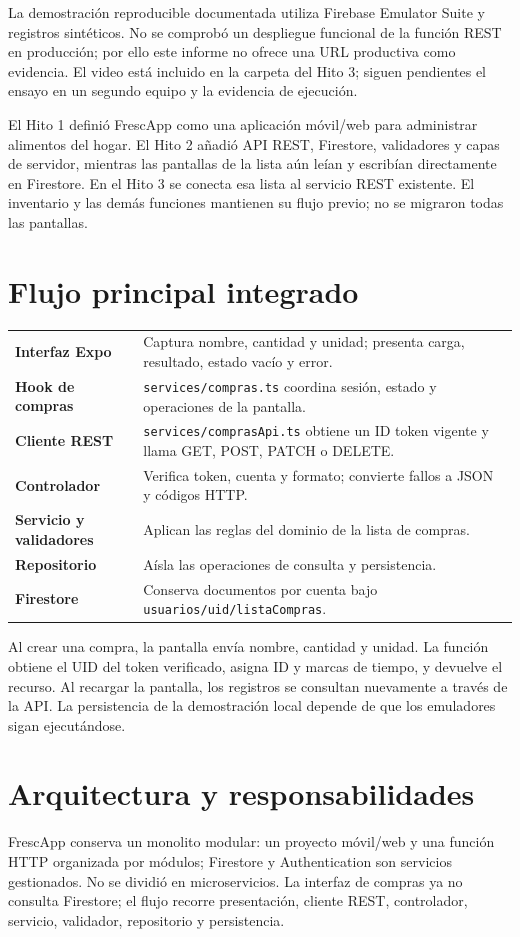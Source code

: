 \documentclass[11pt,a4paper]{article}
\newcommand{\pathcode}[1]{\texttt{\small #1}}
\begin{document}
La demostración reproducible documentada utiliza Firebase Emulator Suite y registros sintéticos. No se comprobó un despliegue funcional de la función REST en producción; por ello este informe no ofrece una URL productiva como evidencia. El video está incluido en la carpeta del Hito 3; siguen pendientes el ensayo en un segundo equipo y la evidencia de ejecución.

El Hito 1 definió FrescApp como una aplicación móvil/web para administrar alimentos del hogar. El Hito 2 añadió API REST, Firestore, validadores y capas de servidor, mientras las pantallas de la lista aún leían y escribían directamente en Firestore. En el Hito 3 se conecta esa lista al servicio REST existente. El inventario y las demás funciones mantienen su flujo previo; no se migraron todas las pantallas.

\section{Flujo principal integrado}
\begin{tabularx}{\textwidth}{>{\bfseries}p{3.6cm}Y}
Interfaz Expo & Captura nombre, cantidad y unidad; presenta carga, resultado, estado vacío y error.\\
Hook de compras & \pathcode{services/compras.ts} coordina sesión, estado y operaciones de la pantalla.\\
Cliente REST & \pathcode{services/comprasApi.ts} obtiene un ID token vigente y llama GET, POST, PATCH o DELETE.\\
Controlador & Verifica token, cuenta y formato; convierte fallos a JSON y códigos HTTP.\\
Servicio y validadores & Aplican las reglas del dominio de la lista de compras.\\
Repositorio & Aísla las operaciones de consulta y persistencia.\\
Firestore & Conserva documentos por cuenta bajo \pathcode{usuarios/{uid}/listaCompras}.\\
\end{tabularx}

Al crear una compra, la pantalla envía nombre, cantidad y unidad. La función obtiene el UID del token verificado, asigna ID y marcas de tiempo, y devuelve el recurso. Al recargar la pantalla, los registros se consultan nuevamente a través de la API. La persistencia de la demostración local depende de que los emuladores sigan ejecutándose.

\section{Arquitectura y responsabilidades}
FrescApp conserva un monolito modular: un proyecto móvil/web y una función HTTP organizada por módulos; Firestore y Authentication son servicios gestionados. No se dividió en microservicios. La interfaz de compras ya no consulta Firestore; el flujo recorre presentación, cliente REST, controlador, servicio, validador, repositorio y persistencia.
\end{document}
